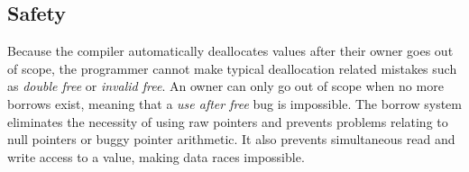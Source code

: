 \subsection{Safety}
Because the compiler automatically deallocates values after their owner goes out of scope, the programmer cannot make typical deallocation related mistakes such as \textit{double free} or \textit{invalid free}. An owner can only go out of scope when no more borrows exist, meaning that a \textit{use after free} bug is impossible. The borrow system eliminates the necessity of using raw pointers and prevents problems relating to null pointers or buggy pointer arithmetic. It also prevents simultaneous read and write access to a value, making data races impossible.

